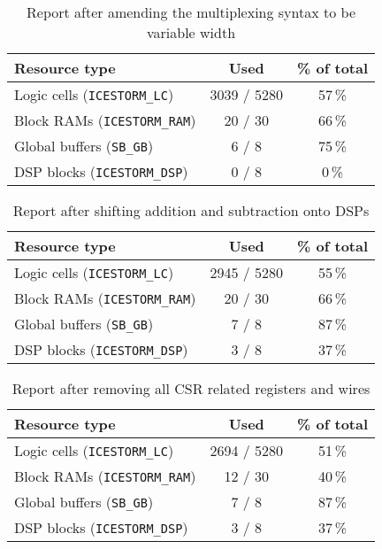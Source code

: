 \documentclass[a4paper,10pt]{article}
\begin{document}
\begin{table}[H] 
    \centering
    \begin{tabularx}{0.65\textwidth}{X c c}
        \toprule
        Resource type & Used & \% of total \\ \midrule
        Logic cells (\texttt{ICESTORM\_LC}) & 3039 / 5280 & 57\,\% \\
        Block RAMs (\texttt{ICESTORM\_RAM}) & 20 / 30 & 66\,\% \\
        Global buffers (\texttt{SB\_GB}) & 6 / 8 & 75\,\% \\
        DSP blocks (\texttt{ICESTORM\_DSP}) & 0 / 8 & 0\,\% \\
        \bottomrule
    \end{tabularx}
    \caption{Report after amending the multiplexing syntax to be variable width}
    \label{tab:Mux}
\end{table}

\begin{table}[H] 
    \centering
    \begin{tabularx}{0.65\textwidth}{X c c}
        \toprule
        Resource type & Used & \% of total \\ \midrule
        Logic cells (\texttt{ICESTORM\_LC}) & 2945 / 5280 & 55\,\% \\
        Block RAMs (\texttt{ICESTORM\_RAM}) & 20 / 30 & 66\,\% \\
        Global buffers (\texttt{SB\_GB}) & 7 / 8 & 87\,\% \\
        DSP blocks (\texttt{ICESTORM\_DSP}) & 3 / 8 & 37\,\% \\
        \bottomrule
    \end{tabularx}
    \caption{Report after shifting addition and subtraction onto DSPs}
    \label{tab:DSP}
\end{table}

\begin{table}[H] 
    \centering
    \begin{tabularx}{0.65\textwidth}{X c c}
        \toprule
        Resource type & Used & \% of total \\ \midrule
        Logic cells (\texttt{ICESTORM\_LC}) & 2694 / 5280 & 51\,\% \\
        Block RAMs (\texttt{ICESTORM\_RAM}) & 12 / 30 & 40\,\% \\
        Global buffers (\texttt{SB\_GB}) & 7 / 8 & 87\,\% \\
        DSP blocks (\texttt{ICESTORM\_DSP}) & 3 / 8 & 37\,\% \\
        \bottomrule
    \end{tabularx}
    \caption{Report after removing all CSR related registers and wires}
    \label{tab:CSR}
\end{table}
\end{document}
